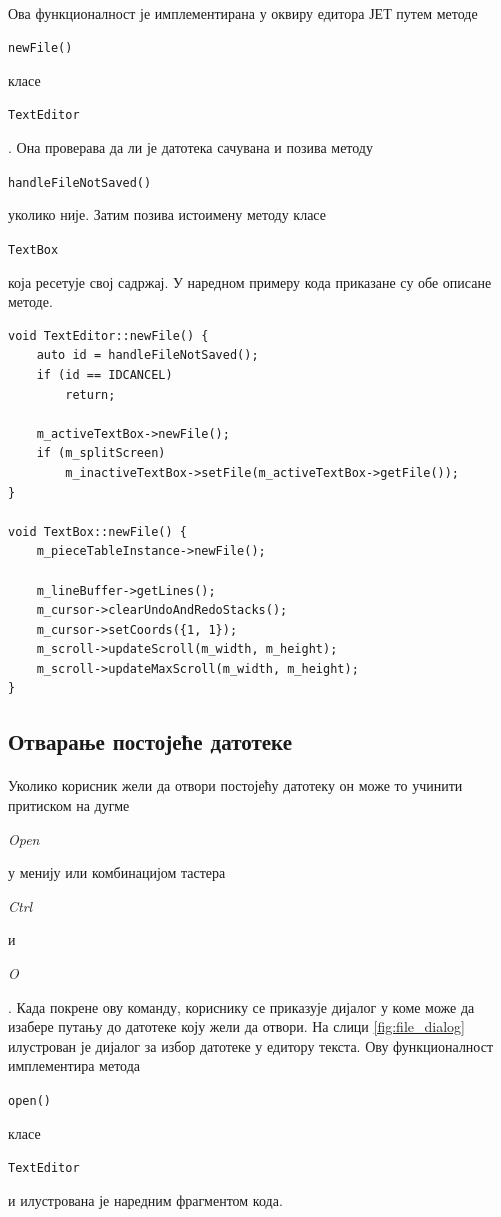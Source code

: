 \documentclass[12pt,oneside]{memoir}
\begin{document}
\paragraph{}
Ова функционалност је имплементирана у оквиру едитора ЈЕТ путем методе
\begin{latinica}\verb|newFile()|\end{latinica} класе
\begin{latinica}\verb|TextEditor|\end{latinica}. Она проверава да ли је датотека
сачувана и позива методу
\begin{latinica}\verb|handleFileNotSaved()|\end{latinica} 
уколико није. Затим позива истоимену методу класе \begin{latinica}\verb|TextBox|\end{latinica} која ресетује свој садржај.
У наредном примеру кода приказане су обе описане методе.

\begin{verbatim}
void TextEditor::newFile() {
	auto id = handleFileNotSaved();
	if (id == IDCANCEL)
		return;
	
	m_activeTextBox->newFile();
	if (m_splitScreen)
		m_inactiveTextBox->setFile(m_activeTextBox->getFile());
}

void TextBox::newFile() {
	m_pieceTableInstance->newFile();
	
	m_lineBuffer->getLines();
	m_cursor->clearUndoAndRedoStacks();
	m_cursor->setCoords({1, 1});
	m_scroll->updateScroll(m_width, m_height);
	m_scroll->updateMaxScroll(m_width, m_height);
}
\end{verbatim}

\subsection{Отварање постојеће датотеке}
\paragraph{}
Уколико корисник жели да отвори постојећу датотеку он може то учинити притиском
на дугме \begin{latinica}\textit{Open}\end{latinica} у менију или комбинацијом
тастера \begin{latinica}\textit{Ctrl}\end{latinica} и \begin{latinica}\textit{O}\end{latinica}. Када покрене ову команду, кориснику
се приказује дијалог у коме може да изабере путању до датотеке коју жели да отвори. На слици \ref{fig:file_dialog} илустрован је дијалог за избор датотеке у едитору текста. Ову функционалност имплементира метода \begin{latinica}\verb|open()|\end{latinica} класе \begin{latinica}\verb|TextEditor|\end{latinica} и илустрована је наредним фрагментом кода.
\end{document}
